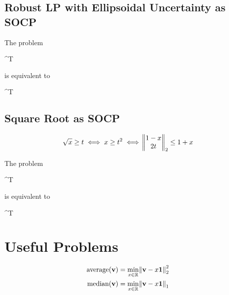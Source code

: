 \subsection{Robust LP with Ellipsoidal Uncertainty as SOCP}

The problem
\begin{mini!}{\vx}{\vc^T \vx}{}{}
\end{mini!}
is equivalent to
\begin{mini!}{\vx}{\vc^T \vx}{}{}
\end{mini!}

\subsection{Square Root as SOCP}
\begin{equation}
\sqrt{x}\ge t \iff x\ge t^2 \iff \norm{\begin{matrix} 1-x \\ 2t \end{matrix}}_2 \le 1+x %
\end{equation}

The problem
\begin{mini!}{\vx}{\vc^T \vx}{}{}
\end{mini!}
is equivalent to
\begin{mini!}{\vx}{\vc^T \vx}{}{}
\end{mini!}


\section{Useful Problems}

\begin{align}
\textrm{average}(\mathbf{v}) &= \min_{x\in\mathbb{R}} \norm{\mathbf{v}-x\mathbf{1}}_2^2 \\
\textrm{median}(\mathbf{v}) &= \min_{x\in\mathbb{R}} \norm{\mathbf{v}-x\mathbf{1}}_1
\end{align}